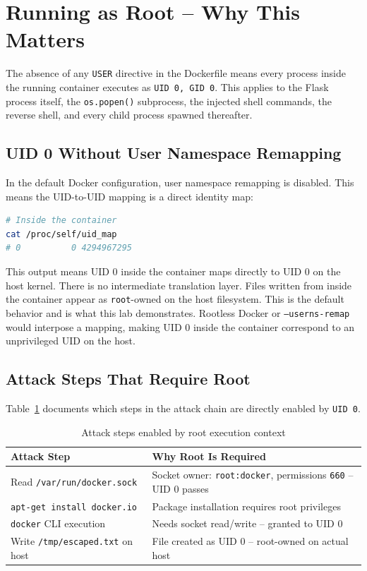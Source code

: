 \vspace{0.3cm}

\section{Running as Root -- Why This Matters}

The absence of any \texttt{USER} directive in the Dockerfile means every process inside the running container executes as \texttt{UID 0, GID 0}. This applies to the Flask process itself, the \texttt{os.popen()} subprocess, the injected shell commands, the reverse shell, and every child process spawned thereafter.

\subsection*{UID 0 Without User Namespace Remapping}

In the default Docker configuration, user namespace remapping is disabled. This means the UID-to-UID mapping is a direct identity map:

\begin{lstlisting}[language=bash]
# Inside the container
cat /proc/self/uid_map
# 0          0 4294967295
\end{lstlisting}

This output means UID 0 inside the container maps directly to UID 0 on the host kernel. There is no intermediate translation layer. Files written from inside the container appear as \texttt{root}-owned on the host filesystem. This is the default behavior and is what this lab demonstrates. Rootless Docker or \texttt{--userns-remap} would interpose a mapping, making UID 0 inside the container correspond to an unprivileged UID on the host.

\subsection*{Attack Steps That Require Root}

Table~\ref{tab:root_dependency} documents which steps in the attack chain are directly enabled by \texttt{UID 0}.

\begin{table}[h]
\centering
\caption{Attack steps enabled by root execution context}
\label{tab:root_dependency}
\begin{tabular}{|l|l|}
\hline
\textbf{Attack Step} & \textbf{Why Root Is Required} \\
\hline
Read \texttt{/var/run/docker.sock} & Socket owner: \texttt{root:docker}, permissions \texttt{660} -- UID 0 passes \\
\texttt{apt-get install docker.io} & Package installation requires root privileges \\
\texttt{docker} CLI execution & Needs socket read/write -- granted to UID 0 \\
Write \texttt{/tmp/escaped.txt} on host & File created as UID 0 -- root-owned on actual host \\
\hline
\end{tabular}
\end{table}

